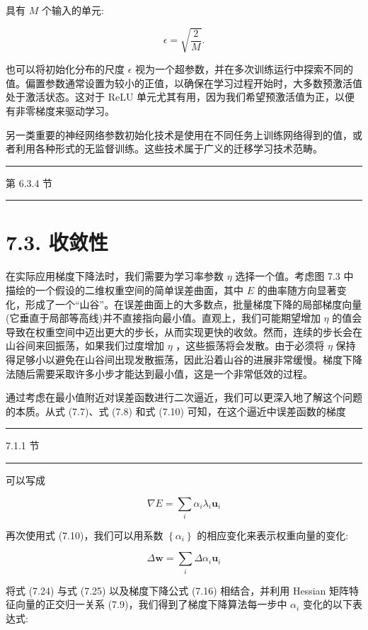\documentclass[10pt]{article}
\newcommand{\HRule}{\begin{center}\rule{0.9\linewidth}{0.2mm}\end{center}}
\begin{document}
具有 \(M\) 个输入的单元:

\[
\epsilon  = \sqrt{\frac{2}{M}}. \tag{7.23}
\]

也可以将初始化分布的尺度 \(\epsilon\) 视为一个超参数，并在多次训练运行中探索不同的值。偏置参数通常设置为较小的正值，以确保在学习过程开始时，大多数预激活值处于激活状态。这对于 ReLU 单元尤其有用，因为我们希望预激活值为正，以便有非零梯度来驱动学习。

另一类重要的神经网络参数初始化技术是使用在不同任务上训练网络得到的值，或者利用各种形式的无监督训练。这些技术属于广义的迁移学习技术范畴。

\HRule

第 6.3.4 节

\HRule

\section*{7.3. 收敛性}

在实际应用梯度下降法时，我们需要为学习率参数 \(\eta\) 选择一个值。考虑图 7.3 中描绘的一个假设的二维权重空间的简单误差曲面，其中 \(E\) 的曲率随方向显著变化，形成了一个“山谷”。在误差曲面上的大多数点，批量梯度下降的局部梯度向量(它垂直于局部等高线)并不直接指向最小值。直观上，我们可能期望增加 \(\eta\) 的值会导致在权重空间中迈出更大的步长，从而实现更快的收敛。然而，连续的步长会在山谷间来回振荡，如果我们过度增加 \(\eta\) ，这些振荡将会发散。由于必须将 \(\eta\) 保持得足够小以避免在山谷间出现发散振荡，因此沿着山谷的进展非常缓慢。梯度下降法随后需要采取许多小步才能达到最小值，这是一个非常低效的过程。

通过考虑在最小值附近对误差函数进行二次逼近，我们可以更深入地了解这个问题的本质。从式 (7.7)、式 (7.8) 和式 (7.10) 可知，在这个逼近中误差函数的梯度

\HRule

7.1.1 节

\HRule

可以写成

\[
\nabla E = \mathop{\sum }\limits_{i}{\alpha }_{i}{\lambda }_{i}{\mathbf{u}}_{i} \tag{7.24}
\]

再次使用式 (7.10)，我们可以用系数 \(\left\{  {\alpha }_{i}\right\}\) 的相应变化来表示权重向量的变化:

\[
\Delta \mathbf{w} = \mathop{\sum }\limits_{i}\Delta {\alpha }_{i}{\mathbf{u}}_{i} \tag{7.25}
\]

将式 (7.24) 与式 (7.25) 以及梯度下降公式 (7.16) 相结合，并利用 Hessian 矩阵特征向量的正交归一关系 (7.9)，我们得到了梯度下降算法每一步中 \({\alpha }_{i}\) 变化的以下表达式:
\end{document}
